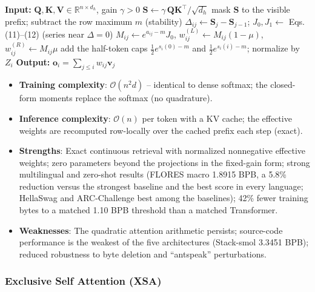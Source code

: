 \begin{algorithmic}[1]
\State \textbf{Input:} $\mathbf{Q}, \mathbf{K}, \mathbf{V} \in \mathbb{R}^{n \times d_h}$, gain $\gamma>0$
\State $\mathbf{S} \gets \gamma\,\mathbf{Q}\mathbf{K}^\top/\sqrt{d_h}$ 
\State mask $\mathbf{S}$ to the visible prefix; subtract the row maximum $m$ (stability)
\State $\Delta_{ij} \gets \mathbf{S}_{j}-\mathbf{S}_{j-1}$; \quad $J_0,J_1 \gets$ Eqs. (11)--(12) (series near $\Delta=0$)
\State $M_{ij} \gets e^{a_{ij}-m}J_0$, \quad $w^{(L)}_{ij}\gets M_{ij}(1-\mu)$, \quad $w^{(R)}_{ij}\gets M_{ij}\mu$
\State add the half-token caps $\tfrac12 e^{s_i(0)-m}$ and $\tfrac12 e^{s_i(i)-m}$; normalize by $Z_i$
\State \textbf{Output:} $\mathbf{o}_i = \sum_{j\le i} w_{ij}\mathbf{v}_j$ 
\end{algorithmic}

\begin{itemize}[leftmargin=*]
    \item \textbf{Training complexity}: $\mathcal{O}(n^2 d)$ -- identical to dense softmax; the closed-form moments replace the softmax (no quadrature).
    \item \textbf{Inference complexity}: $\mathcal{O}(n)$ per token with a KV cache; the effective weights are recomputed row-locally over the cached prefix each step (exact).
    \item \textbf{Strengths}: Exact continuous retrieval with normalized nonnegative effective weights; zero parameters beyond the projections in the fixed-gain form; strong multilingual and zero-shot results (FLORES macro 1.8915 BPB, a 5.8\% reduction versus the strongest baseline and the best score in every language; HellaSwag and ARC-Challenge best among the baselines); 42\% fewer training bytes to a matched 1.10 BPB threshold than a matched Transformer.
    \item \textbf{Weaknesses}: The quadratic attention arithmetic persists; source-code performance is the weakest of the five architectures (Stack-smol 3.3451 BPB); reduced robustness to byte deletion and ``antspeak'' perturbations.
\end{itemize}

\subsubsection{Exclusive Self Attention (XSA)}


